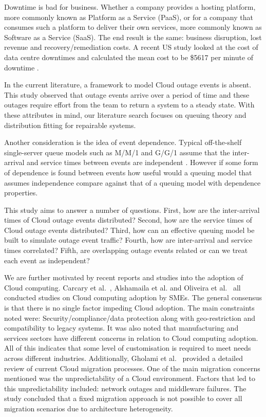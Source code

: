 \documentclass[5p]{elsarticle}
\begin{document}
Downtime is bad for business. Whether a company provides a hosting platform, more commonly known as Platform as a Service (PaaS), or for a company that consumes such a platform to deliver their own services, more commonly known as Software as a Service (SaaS). The end result is the same: business disruption, lost revenue and recovery/remediation costs. A recent US study  looked at the cost of data centre downtimes and calculated the mean cost to be \$5617 per minute of downtime \cite{DCcost}.

In the current literature, a framework to model Cloud outage events is absent. This study observed that outage events arrive over a period of time and these outages require effort from the team to return a system to a steady state. With these attributes in mind, our literature search focuses on queuing theory and distribution fitting for repairable systems.

Another consideration is the idea of event dependence. Typical off-the-shelf single-server queue models such as M/M/1 and G/G/1 assume that the inter-arrival and service times between events are independent \cite{MM1}. However if some form of dependence is found between events how useful would a queuing model that assumes independence compare against that of a queuing model with dependence properties.


This study aims to answer a number of questions. First, how are the inter-arrival times of Cloud outage events distributed? Second, how are the service times of Cloud outage events distributed?  Third, how can an effective queuing model be built to simulate outage event traffic? Fourth, how are inter-arrival and service times correlated? Fifth, are overlapping outage events related or can we treat each event as independent? 



We are further motivated by recent reports and studies into the adoption of Cloud computing.  Carcary et al.~\cite{carcary2014adoption}, Alshamaila et al.  \cite{alshamaila2013cloud} and Oliveira et al.~\cite{oliveira2014assessing} all conducted studies on Cloud computing adoption by SMEs. The general consensus is that there is no single factor impeding Cloud adoption. The main constraints noted were: Security/compliance/data protection along with geo-restriction and compatibility to legacy systems. It was also noted that manufacturing and services sectors have different concerns in relation to Cloud computing adoption. All of this indicates that some level of customisation is required to meet needs across different industries. Additionally, Gholami et al.~\cite{gholami2016Cloud} provided a detailed review of current Cloud migration processes. One of the main migration concerns mentioned was the unpredictability of a Cloud environment. Factors that led to this unpredictability included: network outages and middleware failures. The study concluded that a fixed migration approach is not possible to cover all migration scenarios due to architecture heterogeneity.
\end{document}

